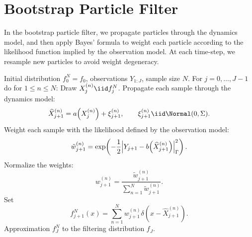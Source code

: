 
\section{Bootstrap Particle Filter}
\label{sec:9.2}

In the bootstrap particle filter, we propagate particles through the dynamics model, and
then apply Bayes' formula to weight each particle according to the likelihood function
implied by the observation model. At each time-step, we resample new particles to avoid
weight degeneracy.

\begin{algorithm}[H]
  \caption{Bootstrap Particle Filter}
  \label{alg:9.1}
  \begin{algorithmic}[1]
    \Require Initial distribution $f_0^N = f_0$, observations $Y_{1:J}$, sample size $N$.
    \State For $j = 0, \ldots, J-1$ do for $1 \leq n \leq N$:
    \State Draw $X_j^{(n)} \iid f_j^N$.
    \State Propagate each sample through the dynamics model:
      \[
        \widehat{X}_{j+1}^{(n)} = a\!\left(X_j^{(n)}\right) + \xi_{j+1}^{(n)},
        \qquad
        \xi_{j+1}^{(n)} \iid \Normal(0, \Sigma).
      \]
    \State Weight each sample with the likelihood defined by the observation model:
      \[
        \tilde{w}_{j+1}^{(n)} = \exp\!\left(
          -\frac{1}{2}\Bigl|Y_{j+1} - b\!\left(\widehat{X}_{j+1}^{(n)}\right)\Bigr|_\Gamma^2
        \right).
      \]
    \State Normalize the weights:
      \[
        w_{j+1}^{(n)} = \frac{\tilde{w}_{j+1}^{(n)}}{\displaystyle\sum_{n=1}^{N} \tilde{w}_{j+1}^{(n)}}.
      \]
    \State Set
      \[
        f_{j+1}^N(x) = \sum_{n=1}^{N} w_{j+1}^{(n)} \delta\!\left(x - \widehat{X}_{j+1}^{(n)}\right).
      \]
    \Ensure Approximation $f_J^N$ to the filtering distribution $f_J$.
  \end{algorithmic}
\end{algorithm}

\medskip
\noindent{}


